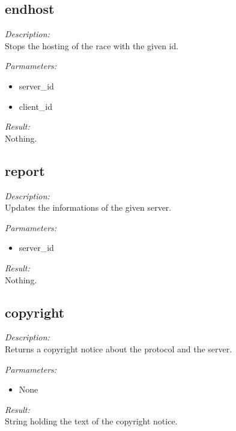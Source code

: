 \subsection{endhost}

\begin{description}
\item {\it Description:}\\
Stops the hosting of the race with the given id.
\item {\it Parmameters:}
\begin{itemize}
\item server\_id
\item client\_id
\end{itemize}
\item {\it Result:}\\
Nothing.
\end{description}

\subsection{report}

\begin{description}
\item {\it Description:}\\
Updates the informations of the given server.
\item {\it Parmameters:}
\begin{itemize}
\item server\_id
\end{itemize}
\item {\it Result:}\\
Nothing.
\end{description}

\subsection{copyright}

\begin{description}
\item {\it Description:}\\
Returns a copyright notice about the protocol and the server.
\item {\it Parmameters:}
\begin{itemize}
\item None
\end{itemize}
\item {\it Result:}\\
String holding the text of the copyright notice.
\end{description}

